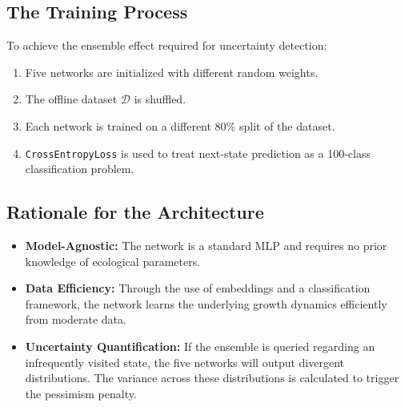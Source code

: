 \documentclass[11pt]{article}
\begin{document}
\subsection*{The Training Process}

To achieve the ensemble effect required for uncertainty detection:
\begin{enumerate}
    \item Five networks are initialized with different random weights.
    \item The offline dataset $\mathcal{D}$ is shuffled.
    \item Each network is trained on a different 80\% split of the dataset.
    \item \texttt{CrossEntropyLoss} is used to treat next-state prediction as a 100-class classification problem.
\end{enumerate}

\subsection*{Rationale for the Architecture}

\begin{itemize}
    \item \textbf{Model-Agnostic:} The network is a standard MLP and requires no prior knowledge of ecological parameters.
    \item \textbf{Data Efficiency:} Through the use of embeddings and a classification framework, the network learns the underlying growth dynamics efficiently from moderate data.
    \item \textbf{Uncertainty Quantification:} If the ensemble is queried regarding an infrequently visited state, the five networks will output divergent distributions. The variance across these distributions is calculated to trigger the pessimism penalty.
\end{itemize}
\end{document}
